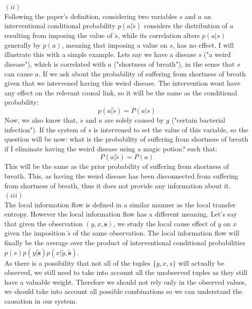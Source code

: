 \documentclass[11pt]{article}
\begin{document}
$(ii)$\\

Following the paper's definition, considering two variables $s$ and $a$ an interventional conditional probability $p(a|\tilde{s})$ considers the distribution of $a$ resulting from imposing the value of $\tilde{s}$, while its correlation alters $p(a|s)$ generally by $p(a)$, meaning that imposing a value on $s$, has no effect. I will illustrate this with a simple example. Lets say we have a disease  $s$ ("a weird disease"), which is correlated with $a$ ("shortness of breath"), in the sense that $s$ can cause $a$.  If we ask about the probability of suffering from shortness of breath given that we intervened having this weird disease. The intervention wont have any effect on the relevant causal link, so it will be the same as the conditional probability: 
\begin{equation*}
p(a|\tilde{s})  = P(a|s)
\end{equation*}
Now, we also know that, $s$ and $a$ are solely caused by $g$ ("certain bacterial infection"). If the system of $s$ is intervened to set the value of this variable, so the question will be now: what is the probability of suffering from shortness of breath if I eliminate having the weird disease using a magic potion? such that:
\begin{equation*}
P(a|\tilde{s})  = P(a)
\end{equation*}
This will be the same as the prior probability of suffering from shortness of breath. This, as having the weird disease has been disconnected from suffering from shortness of breath, thus it does not provide any information about it.\\

 $(iii)$\\
 
The local information flow is defined in a similar manner as the local transfer entropy. However the local information flow has a different meaning. Let's say that given the observation $(y, x, \boldsymbol{s})$, we study the local cause effect of $y$ on $x$ given the imposition $\tilde{s}$ of the same observation. The local information flow will finally be the average over the product of interventional conditional probabilities $p(s) p(y|\boldsymbol{\tilde{s}}) p(x|\tilde{y},\boldsymbol{\tilde{s}})$.\\

As there is a possibility that not all of the tuples $\{y,x,s\}$ will actually be observed, we still need to take into account all the unobserved tuples as they still have a valuable weight. Therefore we should not rely only in the observed values, we should take into account all possible combinations so we can understand the causation in our system.\\
\end{document}
